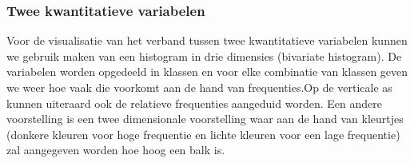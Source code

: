 \documentclass[titlepage]{article}
\numberwithin{equation}{section}
\begin{document}
 \subsubsection{Twee kwantitatieve variabelen}
 Voor de visualisatie van het verband tussen twee kwantitatieve variabelen kunnen we gebruik maken van een histogram in drie dimensies (bivariate histogram). De variabelen worden opgedeeld in klassen en voor elke combinatie van klassen geven we weer hoe vaak die voorkomt aan de hand van frequenties.Op de verticale as kunnen uiteraard ook de relatieve frequenties aangeduid worden.\newline\newline
 Een andere voorstelling is een twee dimensionale voorstelling waar aan de hand van kleurtjes (donkere kleuren voor hoge frequentie en lichte kleuren voor een lage frequentie) zal aangegeven worden hoe hoog een balk is.
\end{document}
